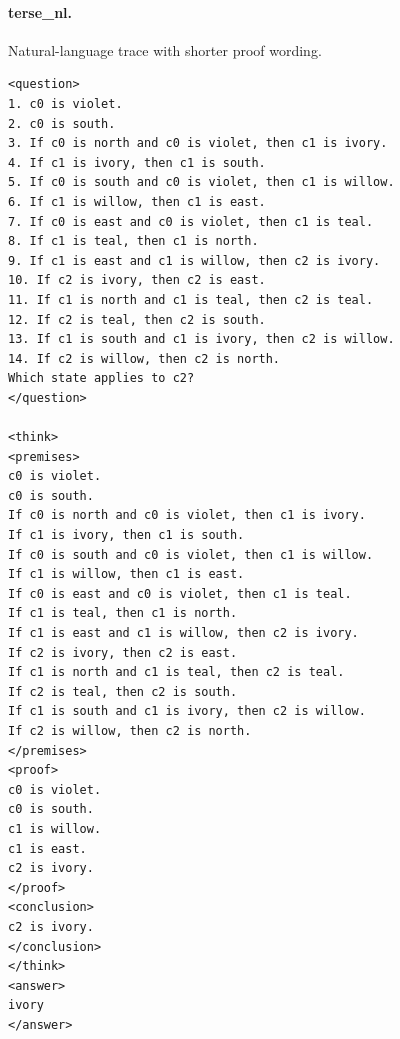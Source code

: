 \documentclass[10pt]{article}
\begin{document}
\paragraph{terse\_nl.} Natural-language trace with shorter proof wording.
\begin{verbatim}
<question>
1. c0 is violet.
2. c0 is south.
3. If c0 is north and c0 is violet, then c1 is ivory.
4. If c1 is ivory, then c1 is south.
5. If c0 is south and c0 is violet, then c1 is willow.
6. If c1 is willow, then c1 is east.
7. If c0 is east and c0 is violet, then c1 is teal.
8. If c1 is teal, then c1 is north.
9. If c1 is east and c1 is willow, then c2 is ivory.
10. If c2 is ivory, then c2 is east.
11. If c1 is north and c1 is teal, then c2 is teal.
12. If c2 is teal, then c2 is south.
13. If c1 is south and c1 is ivory, then c2 is willow.
14. If c2 is willow, then c2 is north.
Which state applies to c2?
</question>

<think>
<premises>
c0 is violet.
c0 is south.
If c0 is north and c0 is violet, then c1 is ivory.
If c1 is ivory, then c1 is south.
If c0 is south and c0 is violet, then c1 is willow.
If c1 is willow, then c1 is east.
If c0 is east and c0 is violet, then c1 is teal.
If c1 is teal, then c1 is north.
If c1 is east and c1 is willow, then c2 is ivory.
If c2 is ivory, then c2 is east.
If c1 is north and c1 is teal, then c2 is teal.
If c2 is teal, then c2 is south.
If c1 is south and c1 is ivory, then c2 is willow.
If c2 is willow, then c2 is north.
</premises>
<proof>
c0 is violet.
c0 is south.
c1 is willow.
c1 is east.
c2 is ivory.
</proof>
<conclusion>
c2 is ivory.
</conclusion>
</think>
<answer>
ivory
</answer>
\end{verbatim}
\end{document}
